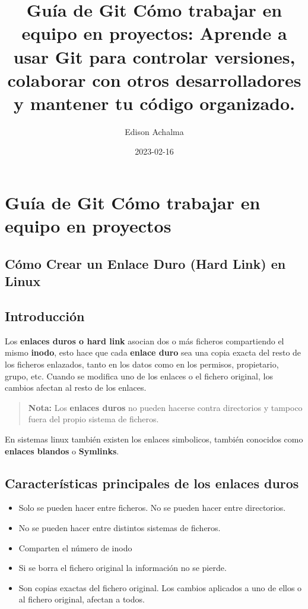 \documentclass[
  jou,
  floatsintext,
  longtable,
  a4paper,
  nolmodern,
  notxfonts,
  notimes,
  colorlinks=true,linkcolor=blue,citecolor=blue,urlcolor=blue]{apa7}
\title{Guía de Git Cómo trabajar en equipo en proyectos: Aprende a usar
Git para controlar versiones, colaborar con otros desarrolladores y
mantener tu código organizado.}
\author{Edison Achalma}
\affiliation{
{Escuela Profesional de Economía, Universidad Nacional de San Cristóbal
de Huamanga}}
\date{2023-02-16}
\providecommand{\tightlist}{%
  \setlength{\itemsep}{0pt}\setlength{\parskip}{0pt}}
\begin{document}
\maketitle

\hypertarget{toc}{}
\tableofcontents
\newpage
\section[Introduction]{Guía de Git Cómo trabajar en equipo en proyectos}

\setcounter{secnumdepth}{-\maxdimen} %

\setlength\LTleft{0pt}


\subsection{Cómo Crear un Enlace Duro (Hard Link) en
Linux}\label{cuxf3mo-crear-un-enlace-duro-hard-link-en-linux}

\subsection{Introducción}\label{introducciuxf3n}

Los \textbf{enlaces duros o hard link} asocian dos o más ficheros
compartiendo el mismo \textbf{inodo}, esto hace que cada \textbf{enlace
duro} sea una copia exacta del resto de los ficheros enlazados, tanto en
los datos como en los permisos, propietario, grupo, etc. Cuando se
modifica uno de los enlaces o el fichero original, los cambios afectan
al resto de los enlaces.

\begin{quote}
\textbf{Nota:} Los \textbf{enlaces duros} no pueden hacerse contra
directorios y tampoco fuera del propio sistema de ficheros.
\end{quote}

En sistemas linux también existen los enlaces simbolicos, también
conocidos como \textbf{enlaces blandos} o \textbf{Symlinks}.

\subsection{Características principales de los enlaces
duros}\label{caracteruxedsticas-principales-de-los-enlaces-duros}

\begin{itemize}
\tightlist
\item
  Solo se pueden hacer entre ficheros. No se pueden hacer entre
  directorios.
\item
  No se pueden hacer entre distintos sistemas de ficheros.
\item
  Comparten el número de inodo
\item
  Si se borra el fichero original la información no se pierde.
\item
  Son copias exactas del fichero original. Los cambios aplicados a uno
  de ellos o al fichero original, afectan a todos.
\end{itemize}
\end{document}
